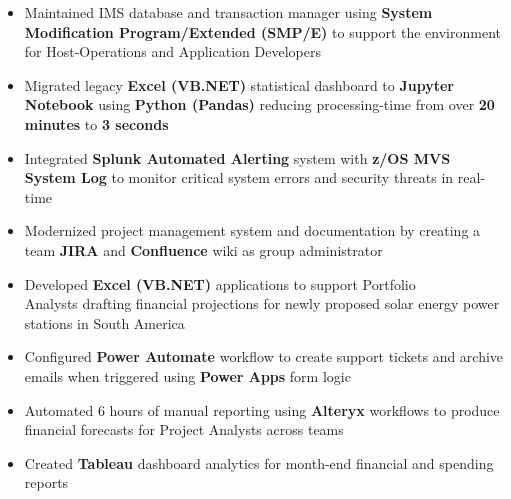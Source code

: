 \documentclass[10pt,a4paper,ragged2e,withhyper]{altacv}
\begin{document}
    \begin{paracol}{2}

        \begin{itemize}
            \item Maintained IMS database and transaction manager using \textbf{ System Modification Program/Extended (SMP/E)} to support the environment for Host-Operations and Application Developers
            \item Migrated legacy \textbf{Excel (VB.NET)} statistical dashboard to \textbf{Jupyter Notebook} using \textbf{Python (Pandas)} reducing processing-time from over \textbf{20 minutes} to \textbf{3 seconds}
            \item Integrated \textbf{Splunk Automated Alerting } system with \textbf{z/OS MVS System Log} to monitor critical system errors and security threats in real-time
            \item Modernized project management system and documentation by creating a team \textbf{JIRA} and \textbf{Confluence} wiki as group administrator
        \end{itemize}

        \medskip

        \begin{itemize}
            \item Developed \textbf{Excel (VB.NET)} applications to support Portfolio\\ Analysts drafting financial projections for newly proposed solar energy power stations in South America
            \item Configured \textbf{Power Automate} workflow to create support tickets and archive emails when triggered using \textbf{Power Apps} form logic  
        \end{itemize}
        
        \medskip
        
        \begin{itemize}
            \item Automated 6 hours of manual reporting using \textbf{Alteryx} workflows to produce financial forecasts for Project Analysts across teams
            \item Created \textbf{Tableau} dashboard analytics for month-end financial and spending reports
        \end{itemize}
        

\end{paracol}
\end{document}
